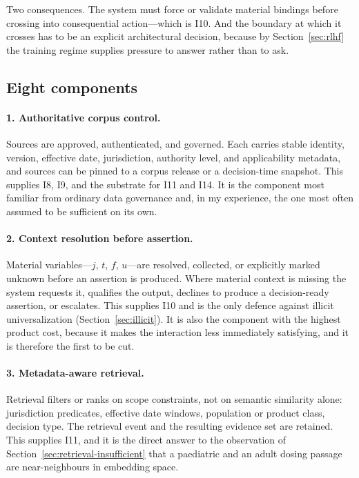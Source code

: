 \documentclass[11pt]{article}
\theoremstyle{plain}
\theoremstyle{definition}
\begin{document}
Two consequences. The system must force or validate material bindings before
crossing into consequential action---which is I10. And the boundary at which it
crosses has to be an explicit architectural decision, because by
Section~\ref{sec:rlhf} the training regime supplies pressure to answer rather than
to ask.

\subsection{Eight components}

\paragraph{1. Authoritative corpus control.} Sources are approved, authenticated,
and governed. Each carries stable identity, version, effective date, jurisdiction,
authority level, and applicability metadata, and sources can be pinned to a corpus
release or a decision-time snapshot. This supplies I8, I9, and the substrate for
I11 and I14. It is the component most familiar from ordinary data governance and,
in my experience, the one most often assumed to be sufficient on its own.

\paragraph{2. Context resolution before assertion.} Material variables---$j$, $t$,
$f$, $u$---are resolved, collected, or explicitly marked unknown before an
assertion is produced. Where material context is missing the system requests it,
qualifies the output, declines to produce a decision-ready assertion, or escalates.
This supplies I10 and is the only defence against illicit universalization
(Section~\ref{sec:illicit}). It is also the component with the highest product cost,
because it makes the interaction less immediately satisfying, and it is therefore
the first to be cut.

\paragraph{3. Metadata-aware retrieval.} Retrieval filters or ranks on scope
constraints, not on semantic similarity alone: jurisdiction predicates, effective
date windows, population or product class, decision type. The retrieval event and
the resulting evidence set are retained. This supplies I11, and it is the direct
answer to the observation of Section~\ref{sec:retrieval-insufficient} that a
paediatric and an adult dosing passage are near-neighbours in embedding space.
\end{document}
